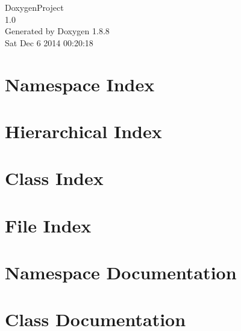 \documentclass[twoside]{book}
\newcommand{\+}{\discretionary{\mbox{\scriptsize$\hookleftarrow$}}{}{}}
\newcommand{\clearemptydoublepage}{%
  \newpage{\pagestyle{empty}\cleardoublepage}%
}
\begin{document}
\hypersetup{pageanchor=false,
             bookmarks=true,
             bookmarksnumbered=true,
             pdfencoding=unicode
            }
\begin{titlepage}
\vspace*{7cm}
\begin{center}%
{\Large Doxygen\+Project \\[1ex]\large 1.\+0 }\\
\vspace*{1cm}
{\large Generated by Doxygen 1.8.8}\\
\vspace*{0.5cm}
{\small Sat Dec 6 2014 00:20:18}\\
\end{center}
\end{titlepage}
\clearemptydoublepage
\tableofcontents
\clearemptydoublepage
{}
\hypersetup{pageanchor=true}

\chapter{Namespace Index}

\chapter{Hierarchical Index}

\chapter{Class Index}

\chapter{File Index}

\chapter{Namespace Documentation}




\chapter{Class Documentation}











\end{document}
